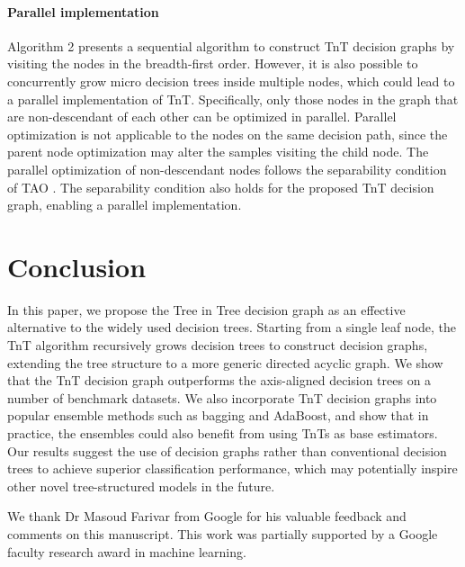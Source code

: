 \documentclass{article}
\begin{document}
\vspace{-2mm}
\paragraph{Parallel implementation}
Algorithm 2 presents a sequential algorithm to construct TnT decision graphs by visiting the nodes in the breadth-first order. However, it is also possible to concurrently grow micro decision trees inside multiple nodes, which could lead to a parallel implementation of TnT. Specifically, only those nodes in the graph that are non-descendant of each other can be optimized in parallel. Parallel optimization is not applicable to the nodes on the same decision path, since the parent node optimization may alter the samples 
visiting the child node. The parallel optimization of non-descendant nodes follows the separability condition of TAO \cite{carreira2018alternating,zharmagambetov2020smaller}. The separability condition also holds for the proposed TnT decision graph, enabling a parallel implementation.


\vspace{-0mm}
\section{Conclusion}\vspace{-0mm}
In this paper, we propose the Tree in Tree decision graph as an effective alternative to the widely used decision trees. Starting from a single leaf node, the TnT algorithm recursively grows decision trees to construct decision graphs, extending the tree structure to a more generic directed acyclic graph. We show that the TnT decision graph outperforms the axis-aligned decision trees on a number of benchmark datasets. We also incorporate TnT decision graphs into popular ensemble methods such as bagging and AdaBoost, and show that in practice, the ensembles could also benefit from using TnTs as base estimators. Our results suggest the use of decision graphs rather than conventional decision trees to achieve superior classification performance, which may potentially inspire other novel tree-structured models in the future.   


\begin{ack}
We thank Dr Masoud Farivar from Google for his valuable feedback and comments on this manuscript. This work was partially supported by a Google faculty research award in machine learning.
\end{ack}

\medskip

\small



\end{document}
